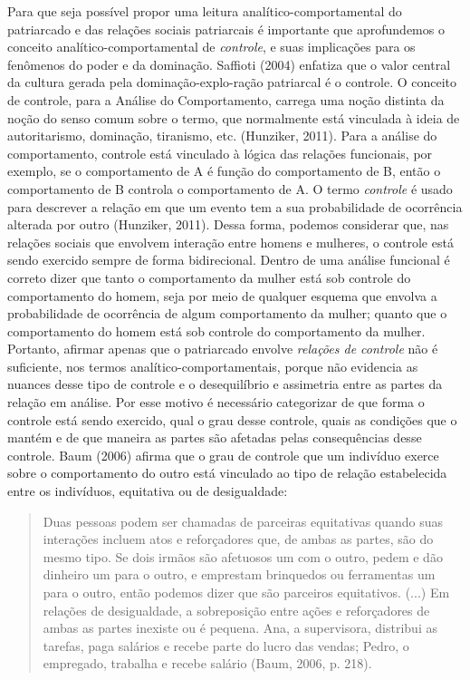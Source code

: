 Para que seja possível propor uma leitura analítico-comportamental do patriarcado e das relações sociais patriarcais é importante que aprofundemos o conceito analítico-comportamental de \textit{controle}, e suas implicações para os fenômenos do poder e da dominação. Saffioti (2004) enfatiza que o valor central da cultura gerada pela dominação-explo-\linebreak ração patriarcal é o controle. O conceito de controle, para a Análise do Comportamento, carrega uma noção distinta da noção do senso comum sobre o termo, que normalmente está vinculada à ideia de autoritarismo, dominação, tiranismo, etc. (Hunziker, 2011). Para a análise do comportamento, controle está vinculado à lógica das relações funcionais, por exemplo, se o comportamento de A é função do comportamento de B, então o comportamento de B controla o comportamento de A. O termo \textit{controle} é usado para descrever a relação em que um evento tem a sua probabilidade de ocorrência alterada por outro (Hunziker, 2011). Dessa forma, podemos considerar que, nas relações sociais que envolvem interação entre homens e mulheres, o controle está sendo exercido sempre de forma bidirecional. Dentro de uma análise funcional é correto dizer que tanto o comportamento da mulher está sob controle do comportamento do homem, seja por meio de qualquer esquema que envolva a probabilidade de ocorrência de algum comportamento da mulher; quanto que o comportamento do homem está sob controle do comportamento da mulher. Portanto, afirmar apenas que o patriarcado envolve \textit{relações de controle} não é suficiente, nos termos analítico-comportamentais, porque não evidencia as nuances desse tipo de controle e o desequilíbrio e assimetria entre as partes da relação em análise. Por esse motivo é necessário categorizar de que forma o controle está sendo exercido, qual o grau desse controle, quais as condições que o mantém e de que maneira as partes são afetadas pelas consequências desse controle. Baum (2006) afirma que o grau de controle que um indivíduo exerce sobre o comportamento do outro está vinculado ao tipo de relação estabelecida entre os indivíduos, equitativa ou de desigualdade:

\begin{quote}
    Duas pessoas podem ser chamadas de parceiras equitativas quando suas interações incluem atos e reforçadores que, de ambas as partes, são do mesmo tipo. Se dois irmãos são afetuosos um com o outro, pedem e dão dinheiro um para o outro, e emprestam brinquedos ou ferramentas um para o outro, então podemos dizer que são parceiros equitativos. (...) Em relações de desigualdade, a sobreposição entre ações e reforçadores de ambas as partes inexiste ou é pequena. Ana, a supervisora, distribui as tarefas, paga salários e recebe parte do lucro das vendas; Pedro, o empregado, trabalha e recebe salário (Baum, 2006, p. 218).
\end{quote}

